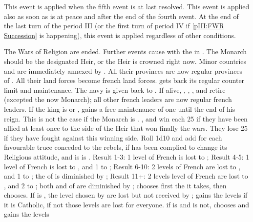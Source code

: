 
\activation{}
\aparag This event is applied when the fifth event  is at last
resolved.
\aparag This event is applied also as soon as \FRA is at peace and \CATHCO
after the end of the fourth event.
\aparag At the end of the last turn of the period III (or the first turn of
period IV if \ref{pIII:FWR Succession} is happening), this event is applied
regardless of other conditions.

\phinter
\aparag The Wars of Religion are ended. Further events 
cause \RD with the \REVOLT in \FRA.
\aparag The Monarch should be the designated Heir, or the Heir is crowned
right now.
\aparag Minor countries \hug and \lig are immediately annexed by \FRA. All
their provinces are now regular provinces of \FRA. All their land forces
become french land forces. \FRA gets back its regular counter limit and
maintenance.  The navy is given back to \FRA. If alive, \leaderConde,
\leaderColigny, \leaderMayenne, \leaderNavarre and 
retire (excepted the now Monarch); all other french leaders are now regular
french leaders.
\aparag If the king is  or , \FRA
gains a free maintenance of one \ARMY \faceplus until the end of his
reign. This is not the case if the Monarch is .
\ENG, \HOL and \SPA win each 25 \PV if they have been allied at least once to
the side of the Heir that won finally the wars. They lose 25 \PV if they have
fought against this winning side.
 Roll 1d10 and add  for each
favourable truce conceded to the rebels,  if \FRA has been complied
to change its Religious attitude, and  is \FRA is \CATHCR.
\bparag Result 1-3: 1 level of French \TradeFLEET is lost to \HOL;
\bparag Result 4-5: 1 level of French \TradeFLEET is lost to \HOL, and 1 to
\ENG;
\bparag Result 6-10: 2 levels of French \TradeFLEET are lost to \HOL, and 1 to
\ENG; the \FTI of \FRA is diminished by ;
\bparag Result 11+: 2 levels level of French \TradeFLEET are lost to \HOL, and
2 to \ENG; both \FTI and \DTI of \FRA are diminished by ;
\bparag \HOL chooses first the \TradeFLEET it takes, then \ENG chooses.
\bparag If \FRA is \CATHCR, the level chosen by \HOL are lost but not received
by \HOL; \ENG gains the levels if it is Catholic, if not those levels are lost
for everyone.
\bparag if \ENG is \CATHCR and \FRA is not, \SUE chooses and gains the levels
